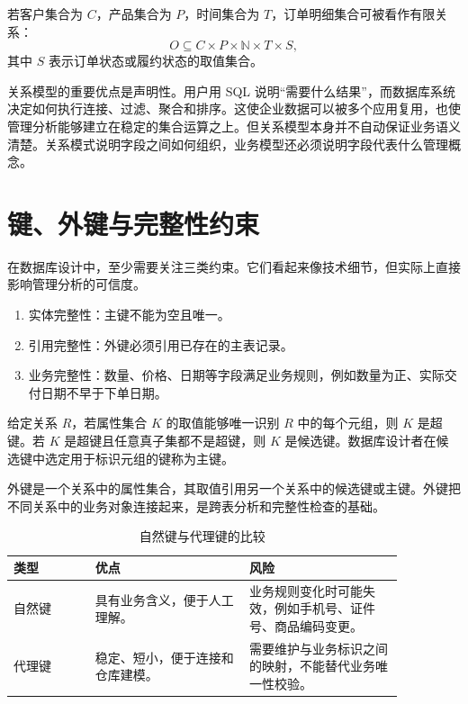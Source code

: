 \documentclass[UTF8,fontset=fandol,openany,zihao=-4]{ctexbook}
\begin{document}
若客户集合为 \(C\)，产品集合为 \(P\)，时间集合为 \(T\)，订单明细集合可被看作有限关系：
\[
O \subseteq C\times P\times \mathbb N\times T\times S,
\]
其中 \(S\) 表示订单状态或履约状态的取值集合。

关系模型的重要优点是声明性。用户用 SQL 说明“需要什么结果”，而数据库系统决定如何执行连接、过滤、聚合和排序。这使企业数据可以被多个应用复用，也使管理分析能够建立在稳定的集合运算之上。但关系模型本身并不自动保证业务语义清楚。关系模式说明字段之间如何组织，业务模型还必须说明字段代表什么管理概念。

\section{键、外键与完整性约束}

在数据库设计中，至少需要关注三类约束。它们看起来像技术细节，但实际上直接影响管理分析的可信度。

\begin{enumerate}
  \item 实体完整性：主键不能为空且唯一。
  \item 引用完整性：外键必须引用已存在的主表记录。
  \item 业务完整性：数量、价格、日期等字段满足业务规则，例如数量为正、实际交付日期不早于下单日期。
\end{enumerate}

\begin{definition}[键]
给定关系 \(R\)，若属性集合 \(K\) 的取值能够唯一识别 \(R\) 中的每个元组，则 \(K\) 是超键。若 \(K\) 是超键且任意真子集都不是超键，则 \(K\) 是候选键。数据库设计者在候选键中选定用于标识元组的键称为主键。
\end{definition}

\begin{definition}[外键]
外键是一个关系中的属性集合，其取值引用另一个关系中的候选键或主键。外键把不同关系中的业务对象连接起来，是跨表分析和完整性检查的基础。
\end{definition}

\begin{table}[htbp]
\centering
\caption{自然键与代理键的比较}
\begin{tabular}{p{0.18\linewidth}p{0.34\linewidth}p{0.34\linewidth}}
\toprule
类型 & 优点 & 风险\\
\midrule
自然键 & 具有业务含义，便于人工理解。 & 业务规则变化时可能失效，例如手机号、证件号、商品编码变更。\\
代理键 & 稳定、短小，便于连接和仓库建模。 & 需要维护与业务标识之间的映射，不能替代业务唯一性校验。\\
\bottomrule
\end{tabular}
\end{table}
\end{document}
